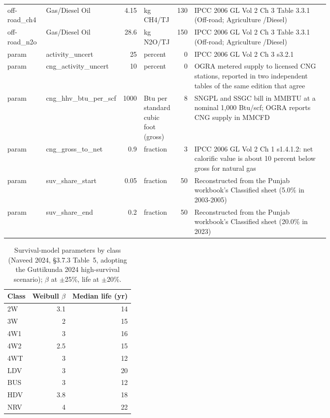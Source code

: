 {\begin{longtable}{@{}>{\raggedright\arraybackslash}p{0.12\linewidth}>{\raggedright\arraybackslash}p{0.13\linewidth}r>{\raggedright\arraybackslash}p{0.09\linewidth}r>{\raggedright\arraybackslash}p{0.42\linewidth}@{}}
off-road\_\allowbreak ch4 & Gas/\allowbreak Diesel Oil & 4.15 & kg CH4/\allowbreak TJ & 130 & IPCC 2006 GL Vol 2 Ch 3 Table 3.3.1 (Off-road; Agriculture /\allowbreak  Diesel) \\
off-road\_\allowbreak n2o & Gas/\allowbreak Diesel Oil & 28.6 & kg N2O/\allowbreak TJ & 150 & IPCC 2006 GL Vol 2 Ch 3 Table 3.3.1 (Off-road; Agriculture /\allowbreak  Diesel) \\
\midrule
param & activity\_\allowbreak uncert & 25 & percent & 0 & IPCC 2006 GL Vol 2 Ch 3 s3.2.1 \\
param & cng\_\allowbreak activity\_\allowbreak uncert & 10 & percent & 0 & OGRA metered supply to licensed CNG stations, reported in two independent tables of the same edition that agree \\
param & cng\_\allowbreak hhv\_\allowbreak btu\_\allowbreak per\_\allowbreak scf & 1000 & Btu per standard cubic foot (gross) & 8 & SNGPL and SSGC bill in MMBTU at a nominal 1,000 Btu/\allowbreak scf; OGRA reports CNG supply in MMCFD \\
param & cng\_\allowbreak gross\_\allowbreak to\_\allowbreak net & 0.9 & fraction & 3 & IPCC 2006 GL Vol 2 Ch 1 s1.4.1.2: net calorific value is about 10 percent below gross for natural gas \\
param & suv\_\allowbreak share\_\allowbreak start & 0.05 & fraction & 50 & Reconstructed from the Punjab workbook's Classified sheet (5.0\% in 2003-2005) \\
param & suv\_\allowbreak share\_\allowbreak end & 0.2 & fraction & 50 & Reconstructed from the Punjab workbook's Classified sheet (20.0\% in 2023) \\
\end{longtable}}

\begin{table}[!htbp]
\centering
\scriptsize
\begin{tabular}{@{}lrr@{}}
\toprule
\textbf{Class} & \textbf{Weibull $\beta$} & \textbf{Median life (yr)} \\
\midrule
2W & 3.1 & 14 \\
3W & 2 & 15 \\
4W1 & 3 & 16 \\
4W2 & 2.5 & 15 \\
4WT & 3 & 12 \\
LDV & 3 & 20 \\
BUS & 3 & 12 \\
HDV & 3.8 & 18 \\
NRV & 4 & 22 \\
\bottomrule
\end{tabular}
\caption{Survival-model parameters by class (Naveed 2024, \S3.7.3
Table~5, adopting the Guttikunda 2024 high-survival scenario); $\beta$ at
$\pm$25\%, life at $\pm$20\%.}
\label{tab:s2weibull}
\end{table}

